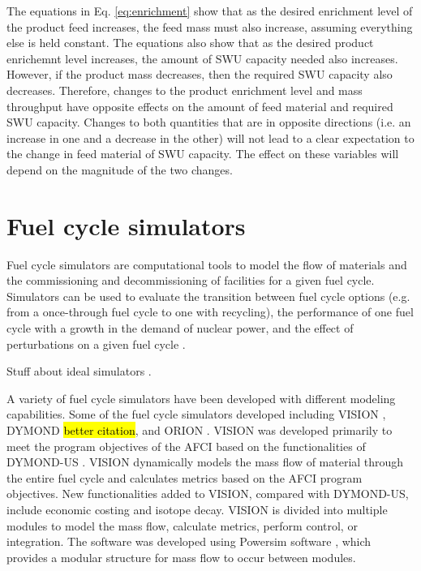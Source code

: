 The equations in Eq. \ref{eq:enrichment} show that as the desired enrichment level 
of the product feed increases, the feed mass must also increase, assuming everything 
else is held constant. The equations also show that as the desired product 
enrichemnt level increases, the amount of \gls{SWU} capacity needed also increases. 
However, if the product mass decreases, then the required \gls{SWU} capacity 
also decreases. Therefore, changes to the product enrichment level and mass 
throughput have opposite effects on the amount of feed material and required 
\gls{SWU} capacity. Changes to both quantities that are in opposite directions 
(i.e. an increase in one and a decrease in the other) will not lead to a clear 
expectation to the change in feed material of \gls{SWU} capacity. The effect 
on these variables will depend on the magnitude of the two changes.

\section{Fuel cycle simulators}
Fuel cycle simulators are computational tools to model the flow of materials
and the commissioning and decommissioning of facilities for a given fuel 
cycle. Simulators can be used to evaluate the transition between fuel cycle 
options (e.g. from a once-through fuel cycle to one with recycling), the 
performance of one fuel cycle with a growth in the demand of nuclear power, 
and the effect of perturbations on a given fuel cycle \cite{piet_dynamic_2011}. 

Stuff about ideal simulators \cite{huff_next_2010,brown_identification_2016}.

A variety of fuel cycle simulators have been developed with different modeling 
capabilities. Some of the fuel cycle simulators developed including VISION 
\cite{yacout_visionverifiable_2006}, 
\gls{DYMOND} \hl{better citation}, and ORION \cite{gregg_analysis_2012}. 
VISION was developed primarily to meet the program objectives of the 
\gls{AFCI} based on the functionalities of \gls{DYMOND}-US \cite{yacout_visionverifiable_2006}.
VISION dynamically models the mass flow of material through the 
entire fuel cycle and calculates metrics based on the \gls{AFCI} program 
objectives. New functionalities added to VISION, compared with \gls{DYMOND}-US, 
include economic costing and isotope decay. VISION is divided into multiple 
modules to model the mass flow, calculate metrics, perform control, or 
integration. The software was developed using Powersim software \cite{powersim_powersim_nodate},
which provides a modular structure for mass flow to occur between modules. 

